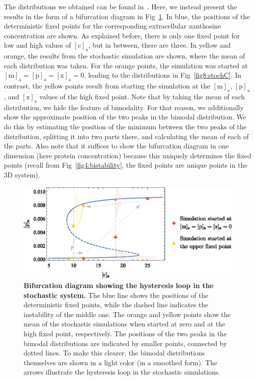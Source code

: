 \documentclass[10pt,letterpaper]{article}
\begin{document}
	The distributions we obtained can be found in~. Here, we instead present the results in the form of a bifurcation diagram in Fig~\ref{fig10:Bifurcation}. In blue, the positions of the deterministic fixed points for the corresponding extracellular xanthosine concentration are shown. As explained before, there is only one fixed point for low and high values of $\mathrm{[c]_a}$, but in between, there are three. In yellow and orange, the results from the stochastic simulation are shown, where the mean of each distribution was taken. For the orange points, the simulation was started at $\mathrm{[m]_a}=\mathrm{[p]_a}=\mathrm{[x]_a}=0$, leading to the distributions in Fig~\ref{fig8:stochC}. In contrast, the yellow points result from starting the simulation at the $\mathrm{[m]_a}$, $\mathrm{[p]_a}$, and $\mathrm{[x]_a}$ values of the high fixed point. Note that by taking the mean of each distribution, we hide the feature of bimodality. For that reason, we additionally show the approximate position of the two peaks in the bimodal distribution. We do this by estimating the position of the minimum between the two peaks of the distribution, splitting it into two parts there, and calculating the mean of each of the parts. Also note that it suffices to show the bifurcation diagram in one dimension (here protein concentration) because this uniquely determines the fixed points (recall from Fig~\ref{fig4:bistability}, the fixed points are unique points in the 3D system).
	
	\begin{figure}%
		\centering
		\includegraphics{media/Fig10_bifurcation.eps}
		\caption{{\bf Bifurcation diagram showing the hysteresis loop in the stochastic system.}
			The blue line shows the positions of the deterministic fixed
			points, while the dashed line indicates the instability of
			the middle one. The orange and yellow points show the mean
			of the stochastic simulations when started at zero and at
			the high fixed point, respectively. The positions of the two
			peaks in the bimodal distributions are indicated by smaller
			points, connected by dotted lines. To make this clearer, the
			bimodal distributions themselves are shown in a light color (in a smoothed form). The arrows illustrate the
			hysteresis loop in the stochastic simulations.
			}
		\label{fig10:Bifurcation}
	\end{figure}
		
\end{document}
